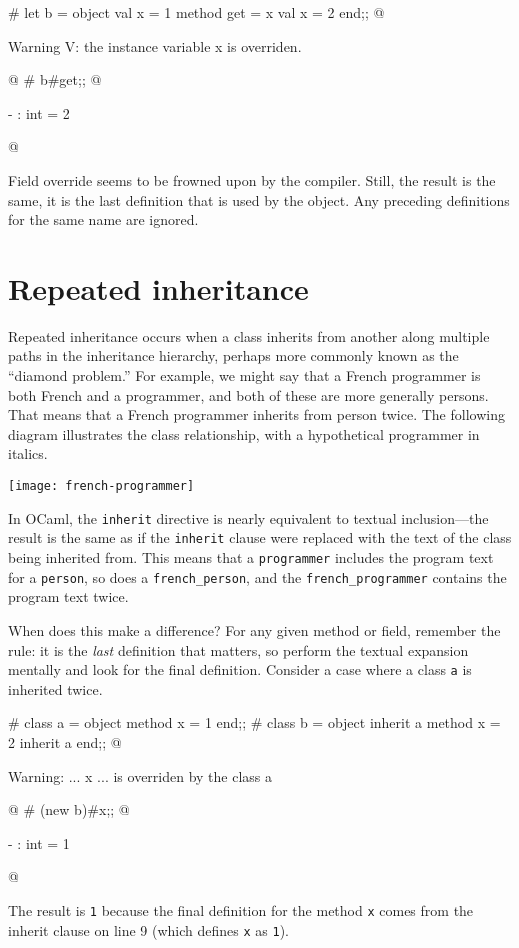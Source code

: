 \begin{ocaml}
# let b =
  object
     val x = 1
     method get = x
     val x = 2
  end;;
@
\begin{topoutput}
Warning V: the instance variable x is overriden.
\end{topoutput}
@
# b#get;;
@
\begin{topoutput}
- : int = 2
\end{topoutput}
@
\end{ocaml}
%
Field override seems to be frowned upon by the compiler.  Still, the result is the same, it is the
last definition that is used by the object.  Any preceding definitions for the same name are
ignored.

\section{Repeated inheritance}

Repeated inheritance occurs when a class inherits from another along multiple paths in the
inheritance hierarchy, perhaps more commonly known as the ``diamond problem.''  For example, we
might say that a French programmer is both French and a programmer, and both of these are more
generally persons.  That means that a French programmer inherits from person twice.  The following
diagram illustrates the class relationship, with a hypothetical programmer in italics.

\begin{center}
\texttt{[image: french-programmer]}
\end{center}
%
In OCaml, the \hbox{\lstinline/inherit/} directive is nearly equivalent to textual inclusion---the result
is the same as if the \hbox{\lstinline/inherit/} clause were replaced with the text of the class being
inherited from.  This means that a \hbox{\lstinline/programmer/} includes the program text for
a \hbox{\lstinline/person/}, so does a \hbox{\lstinline/french_person/}, and the \hbox{\lstinline/french_programmer/}
contains the program text twice.

When does this make a difference?  For any given method or field, remember the rule: it is
the \emph{last} definition that matters, so perform the textual expansion mentally and look for the
final definition.  Consider a case where a class \hbox{\lstinline/a/} is inherited twice.

\begin{ocamlnum}
# class a =
  object
     method x = 1
  end;;
# class b =
  object
     inherit a
     method x = 2
     inherit a
  end;;
@
\begin{topoutput}
Warning: ... x ... is overriden by the class a
\end{topoutput}
@
# (new b)#x;;
@
\begin{topoutput}
- : int = 1
\end{topoutput}
@
\end{ocamlnum}
%
The result is \hbox{\lstinline/1/} because the final definition for the method \hbox{\lstinline/x/} comes from the
inherit clause on line 9 (which defines \hbox{\lstinline/x/} as \hbox{\lstinline/1/}).

